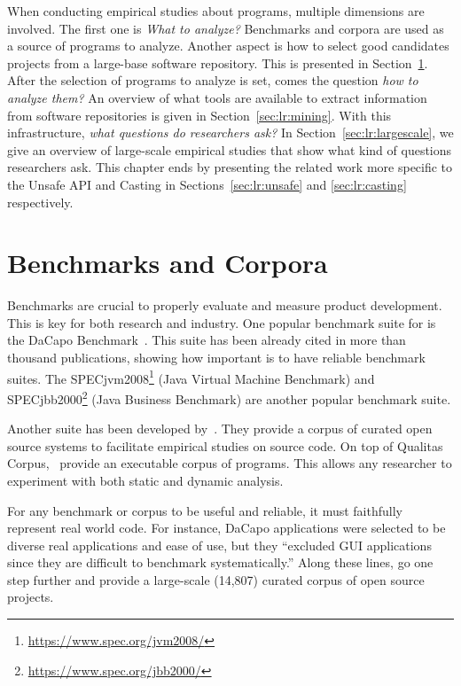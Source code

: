 When conducting empirical studies about programs,
multiple dimensions are involved.
The first one
is 
\emph{What to analyze?}
Benchmarks and corpora are used as a source of programs to analyze.
Another aspect is how to select good candidates projects from a large-base software repository.
This is presented in Section~\ref{sec:lr:benchmarks}.
After the selection of programs to analyze is set,
comes the question \emph{how to analyze them?}
An overview of what tools are available to extract information from software repositories is given in Section~\ref{sec:lr:mining}.
With this infrastructure, \emph{what questions do researchers ask?}
In Section~\ref{sec:lr:largescale}, we give an overview of large-scale
empirical studies
that show what
kind of questions researchers ask.
This chapter ends by presenting the related work more specific to
the Unsafe API and Casting in
Sections~\ref{sec:lr:unsafe} and \ref{sec:lr:casting}
respectively.


\section{Benchmarks and Corpora}
\label{sec:lr:benchmarks}

Benchmarks are crucial to properly evaluate and measure product development.
This is key for both research and industry.
One popular benchmark suite for \java{} is the DaCapo Benchmark~\citep{blackburnDaCapoBenchmarksJava2006}.
This suite has been already cited in more than thousand publications, showing how important is to have reliable benchmark suites.
The SPECjvm2008\footnote{\url{https://www.spec.org/jvm2008/}}
(Java Virtual Machine Benchmark)
and
SPECjbb2000\footnote{\url{https://www.spec.org/jbb2000/}}
(Java Business Benchmark)
are another popular \java{} benchmark suite.

Another suite has been developed by~\cite{temperoQualitasCorpusCurated2010}.
They provide a corpus of curated open source systems to facilitate empirical studies on source code.
On top of Qualitas Corpus,~\cite{dietrichXCorpusExecutableCorpus2017} provide an executable corpus of \java{} programs.
This allows any researcher to experiment with both static and dynamic analysis.

For any benchmark or corpus to be useful and reliable,
it must faithfully represent real world code.
For instance,
DaCapo applications were selected to be diverse real applications and
ease of use, but they ``excluded GUI applications since they are difficult
to benchmark systematically.''
Along these lines, \cite{allamanisMiningSourceCode2013} go one step further and provide a large-scale (14,807) curated corpus of open source \java{} projects.

